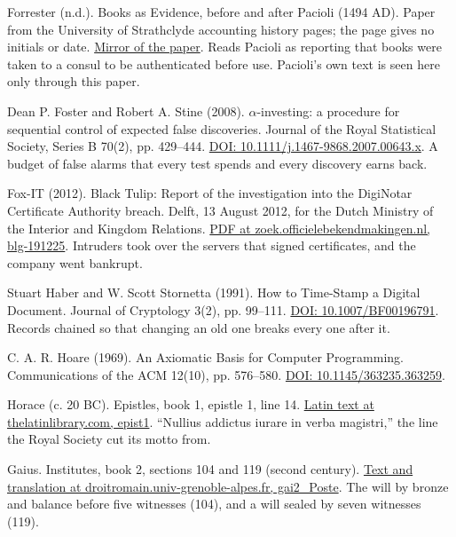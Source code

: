 \documentclass[11pt,twoside]{article}
\theoremstyle{thielethm}
\theoremstyle{thieledef}
\theoremstyle{thieledef}
\theoremstyle{thieledef}
\theoremstyle{thielethm}
\theoremstyle{thieleobs}
\theoremstyle{thielethm}
\begin{document}
\noindent Forrester (n.d.). Books as Evidence, before and after Pacioli (1494 AD). Paper from the University of Strathclyde accounting history pages; the page gives no initials or date. \href{http://www.cs.trinity.edu/rjensen/readings/history/forrester/a01before1494AD.htm}{Mirror of the paper}. Reads Pacioli as reporting that books were taken to a consul to be authenticated before use. Pacioli's own text is seen here only through this paper.
\par\medskip

\noindent Dean P. Foster and Robert A. Stine (2008). $\alpha$-investing: a procedure for sequential control of expected false discoveries. Journal of the Royal Statistical Society, Series B 70(2), pp. 429--444. \href{https://doi.org/10.1111/j.1467-9868.2007.00643.x}{DOI: 10.1111/j.1467-9868.2007.00643.x}. A budget of false alarms that every test spends and every discovery earns back.
\par\medskip

\noindent Fox-IT (2012). Black Tulip: Report of the investigation into the DigiNotar Certificate Authority breach. Delft, 13 August 2012, for the Dutch Ministry of the Interior and Kingdom Relations. \href{https://zoek.officielebekendmakingen.nl/blg-191225.pdf}{PDF at zoek.officielebekendmakingen.nl, blg-191225}. Intruders took over the servers that signed certificates, and the company went bankrupt.
\par\medskip

\noindent Stuart Haber and W. Scott Stornetta (1991). How to Time-Stamp a Digital Document. Journal of Cryptology 3(2), pp. 99--111. \href{https://doi.org/10.1007/BF00196791}{DOI: 10.1007/BF00196791}. Records chained so that changing an old one breaks every one after it.
\par\medskip

\noindent C. A. R. Hoare (1969). An Axiomatic Basis for Computer Programming. Communications of the ACM 12(10), pp. 576--580. \href{https://doi.org/10.1145/363235.363259}{DOI: 10.1145/363235.363259}.
\par\medskip

\noindent Horace (c. 20 BC). Epistles, book 1, epistle 1, line 14. \href{https://www.thelatinlibrary.com/horace/epist1.shtml}{Latin text at thelatinlibrary.com, epist1}. ``Nullius addictus iurare in verba magistri,'' the line the Royal Society cut its motto from.
\par\medskip

\noindent Gaius. Institutes, book 2, sections 104 and 119 (second century). \href{https://droitromain.univ-grenoble-alpes.fr/Anglica/gai2_Poste.htm}{Text and translation at droitromain.univ-grenoble-alpes.fr, gai2\_Poste}. The will by bronze and balance before five witnesses (104), and a will sealed by seven witnesses (119).
\par\medskip
\end{document}
